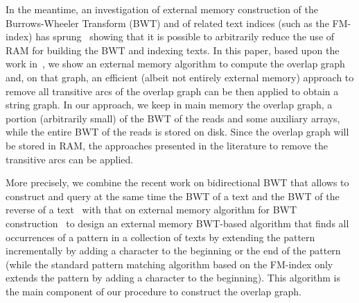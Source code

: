 \documentclass[runningheads,envcountsame,a4paper]{llncs}
\begin{document}
In the meantime, an investigation of external memory construction of the
Burrows-Wheeler Transform (BWT) and of related text indices (such as the
FM-index) has sprung~\cite{Bauer2011,Bauer2013,Ferragina2012} showing that it is possible to
arbitrarily reduce the use of RAM for building the BWT and indexing texts.
In this paper, based upon the work in~\cite{Bauer2011}, we show an external
memory algorithm to compute the overlap graph and, on that graph, an efficient
(albeit not entirely external memory) approach to remove all transitive
arcs of the overlap graph can be then applied to obtain a string graph.
%
%
In our approach, we keep in main memory the overlap graph, a portion (arbitrarily small)
of the BWT of the reads and some auxiliary arrays, while the entire BWT of the reads is stored on disk.
Since the overlap graph will be stored in RAM, the approaches presented in the
literature to remove the transitive arcs can be applied.


More precisely, we combine the recent work on bidirectional BWT that allows to
construct and query at the same time the BWT of a text and the BWT of the
reverse of a text~\cite{Lam2009} with that on external memory algorithm for BWT
construction~\cite{Bauer2011} to design an external memory BWT-based algorithm
that finds all occurrences of a pattern in a collection of texts by extending
the pattern incrementally by adding a character to the beginning or the end of
the pattern (while the standard pattern matching algorithm based on the FM-index
only extends the pattern by adding a character to the beginning).
This algorithm is the main component of our procedure to construct the overlap graph.
\end{document}
